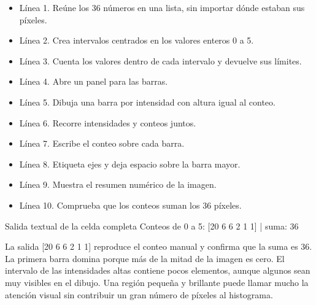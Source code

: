 \begin{itemize}

\item Línea 1. Reúne los 36 números en una lista, sin importar dónde estaban sus píxeles.

\item Línea 2. Crea intervalos centrados en los valores enteros 0 a 5.

\item Línea 3. Cuenta los valores dentro de cada intervalo y devuelve sus límites.

\item Línea 4. Abre un panel para las barras.

\item Línea 5. Dibuja una barra por intensidad con altura igual al conteo.

\item Línea 6. Recorre intensidades y conteos juntos.

\item Línea 7. Escribe el conteo sobre cada barra.

\item Línea 8. Etiqueta ejes y deja espacio sobre la barra mayor.

\item Línea 9. Muestra el resumen numérico de la imagen.

\item Línea 10. Comprueba que los conteos suman los 36 píxeles.

\end{itemize}

\begin{Salida}{Salida textual de la celda completa}
Conteos de 0 a 5: [20  6  6  2  1  1] | suma: 36
\end{Salida}




La salida [20 6 6 2 1 1] reproduce el conteo manual y confirma que la suma es 36. La primera barra domina porque más de la mitad de la imagen es cero. El intervalo de las intensidades altas contiene pocos elementos, aunque algunos sean muy visibles en el dibujo. Una región pequeña y brillante puede llamar mucho la atención visual sin contribuir un gran número de píxeles al histograma.


